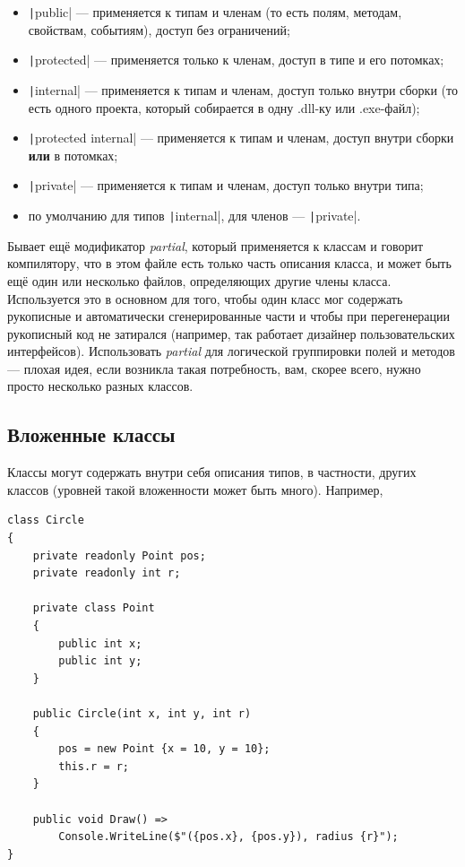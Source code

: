 \documentclass{../../text-style}
\begin{document}
\begin{itemize}
    \item \texttt|public| --- применяется к типам и членам (то есть полям, методам, свойствам, событиям), доступ без ограничений;
    \item \texttt|protected| --- применяется только к членам, доступ в типе и его потомках;
    \item \texttt|internal| --- применяется к типам и членам, доступ только внутри сборки (то есть одного проекта, который собирается в одну .dll-ку или .exe-файл);
    \item \texttt|protected internal| --- применяется к типам и членам, доступ внутри сборки \textbf{или} в потомках;
    \item \texttt|private| --- применяется к типам и членам, доступ только внутри типа;
    \item по умолчанию для типов \texttt|internal|, для членов --- \texttt|private|.
\end{itemize}

Бывает ещё модификатор \textit{partial}, который применяется к классам и говорит компилятору, что в этом файле есть только часть описания класса, и может быть ещё один или несколько файлов, определяющих другие члены класса. Используется это в основном для того, чтобы один класс мог содержать рукописные и автоматически сгенерированные части и чтобы при перегенерации рукописный код не затирался (например, так работает дизайнер пользовательских интерфейсов). Использовать \textit{partial} для логической группировки полей и методов --- плохая идея, если возникла такая потребность, вам, скорее всего, нужно просто несколько разных классов.

\subsection{Вложенные классы}

Классы могут содержать внутри себя описания типов, в частности, других классов (уровней такой вложенности может быть много). Например,

\begin{verbatim}
class Circle
{
    private readonly Point pos;
    private readonly int r;

    private class Point
    {
        public int x;
        public int y;
    }

    public Circle(int x, int y, int r)
    {
        pos = new Point {x = 10, y = 10};
        this.r = r;
    }

    public void Draw() =>
        Console.WriteLine($"({pos.x}, {pos.y}), radius {r}");
}
\end{verbatim}
\end{document}
